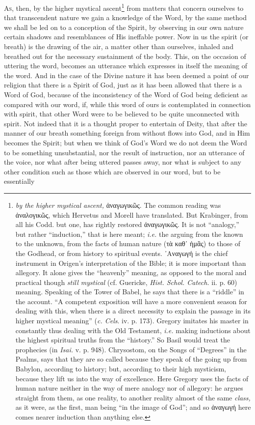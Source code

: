 \textsc{As}, then, by the higher mystical ascent\footnote{\emph{by the higher mystical ascent,} \textgreek{ἀναγωγικῶς}. The common reading was \textgreek{ἀναλογικῶς}, which Hervetus and Morell have translated. But Krabinger, from all his Codd. but one, has rightly restored \textgreek{ἀναγωγικῶς}. It is not “analogy,” but rather “induction,” that is here meant; \emph{i.e.} the arguing from the known to the unknown, from the facts of human nature (\textgreek{τὰ καθ᾽ ἡμᾶς}) to those of the Godhead, or from history to spiritual events. \textgreek{᾽Αναγωγή} is the chief instrument in Origen’s interpretation of the Bible; it is more important than allegory. It alone gives the “heavenly” meaning, as opposed to the moral and practical though \emph{still mystical} (cf. Guericke, \emph{Hist. Schol. Catech.} ii. p. 60) meaning. Speaking of the Tower of Babel, he says that there is a “riddle” in the account. “A competent exposition will have a more convenient season for dealing with this, when there is a direct necessity to explain the passage in its higher mystical meaning” (\emph{c. Cels}. iv. p. 173). Gregory imitates his master in constantly thus dealing with the Old Testament, \emph{i.e.} making inductions about the highest spiritual truths from the “history.” So Basil would treat the prophecies (in \emph{Isai.} v. p. 948). Chrysostom, on the Songs of “Degrees” in the Psalms, says that they are so called because they speak of the going up from Babylon, according to history; but, according to their high mysticism, because they lift us into the way of excellence. Here Gregory uses the facts of human nature neither in the way of mere analogy nor of allegory: he argues straight from them, as one reality, to another reality almost of the same \emph{class,} as it were, as the first, man being “in the image of God”; and so \textgreek{ἀναγωγή} here comes nearer induction than anything else.} from matters that concern ourselves to that transcendent nature we gain a knowledge of the Word, by the same method we shall be led on to a conception of the Spirit, by observing in our own nature certain shadows and resemblances of His ineffable power. Now in us the spirit (or breath) is the drawing of the air, a matter other than ourselves, inhaled and breathed out for the necessary sustainment of the body. This, on the occasion of uttering the word, becomes an utterance which expresses in itself the meaning of the word. And in the case of the Divine nature it has been deemed a point of our religion that there is a Spirit of God, just as it has been allowed that there is a Word of God, because of the inconsistency of the Word of God being deficient as compared with our word, if, while this word of ours is contemplated in connection with spirit, that other Word were to be believed to be quite unconnected with spirit. Not indeed that it is a thought proper to entertain of Deity, that after the manner of our breath something foreign from without flows into God, and in Him becomes the Spirit; but when we think of God’s Word we do not deem the Word to be something unsubstantial, nor the result of instruction, nor an utterance of the voice, nor what after being uttered passes away, nor what is subject to any other condition such as those which are observed in our word, but to be essentially 